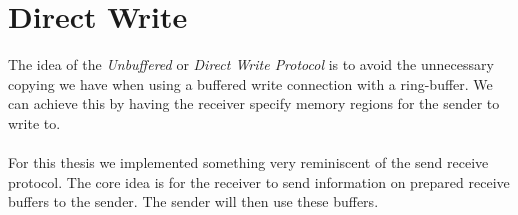 \section{Direct Write}\label{sec:conn:direct_write}

The idea of the \emph{Unbuffered} or \emph{Direct Write Protocol} is to avoid the unnecessary copying we have when using
a buffered write connection with a ring-buffer. We can achieve this by having the receiver specify  memory 
regions for the sender to write to. 

\paragraph{} For this thesis we implemented something very reminiscent of the send receive protocol. The core idea is for
the receiver to send information on prepared receive buffers to the sender. The sender will then use these buffers. 



